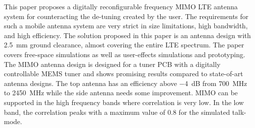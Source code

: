 This paper proposes a digitally reconfigurable frequency MIMO LTE antenna system for counteracting the de-tuning created by the user. The requirements for such a mobile antenna system are very strict in size limitations, high bandwidth, and high efficiency. The solution proposed in this paper is an antenna design with \SI{2.5}{mm} ground clearance, almost covering the entire LTE spectrum. 
The paper covers free-space simulations as well as user-effects simulations and prototyping. The MIMO antenna design is designed for a tuner PCB with a digitally controllable MEMS tuner and shows promising results compared to state-of-art antenna designs. The top antenna has an efficiency above \SI{-4}{dB} from \SI{700}{MHz} to \SI{2450}{MHz} while the side antenna needs some improvement. 
MIMO can be supported in the high frequency bands where correlation is very low. In the low band, the correlation peaks with a maximum value of \num{0.8} for the simulated talk-mode.
